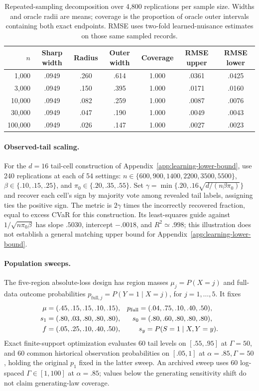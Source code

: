 \begin{table}[!htbp]
\centering\small
\setlength{\tabcolsep}{4pt}
\begin{tabular}{rcccccc}
\toprule
$n$ & Sharp width & Radius & Outer width & Coverage & RMSE upper & RMSE lower\\
\midrule
1{,}000 & .0949 & .260 & .614 & 1.000 & .0361 & .0425\\
3{,}000 & .0949 & .150 & .395 & 1.000 & .0171 & .0160\\
10{,}000 & .0949 & .082 & .259 & 1.000 & .0087 & .0076\\
30{,}000 & .0949 & .047 & .190 & 1.000 & .0049 & .0043\\
100{,}000 & .0949 & .026 & .147 & 1.000 & .0027 & .0023\\
\bottomrule
\end{tabular}
\caption{Repeated-sampling decomposition over 4,800 replications per sample size.
Widths and oracle radii are means; coverage is the proportion of oracle outer
intervals containing both exact endpoints. RMSE uses two-fold learned-nuisance estimates
on those same sampled records.}
\label{tab:finite-sample}
\end{table}

\paragraph{Observed-tail scaling.}
For the $d=16$ tail-cell construction of Appendix~\ref{app:learning-lower-bound}, use 240 replications at each of 54 settings:
$n\in\{600,900,1400,2200,3500,5500\}$,
$\beta\in\{.10,.15,.25\}$, and $\pi_0\in\{.20,.35,.55\}$.
Set $\gamma=\min\{.20,.16\sqrt{d/(n\beta\pi_0)}\}$ and recover each cell's
sign by majority vote among revealed tail labels, assigning ties the positive sign.
The metric is $2\gamma$ times the incorrectly recovered fraction, equal to excess
CVaR for this construction. Its least-squares guide against
$1/\sqrt{n\pi_0\beta}$ has slope $.5030$, intercept $-.0018$, and
$R^2\simeq.998$; this illustration does not establish a general matching upper
bound for Appendix~\ref{app:learning-lower-bound}.

\paragraph{Population sweeps.}
The five-region absolute-loss design has region masses $\mu_j=P(X=j)$ and full-data outcome probabilities $p_{\mathrm{full},j}=P(Y=1\mid X=j)$, for $j=1,\ldots,5$. It fixes
\[
\begin{aligned}
\mu&=(.45,.15,.15,.10,.15),&p_{\rm full}&=(.04,.75,.10,.40,.50),\\
s_1&=(.80,.03,.80,.80,.80),&s_0&=(.80,.60,.80,.80,.80),\\
f&=(.05,.25,.10,.40,.50),&&s_y=P(S=1\mid X,Y=y).
\end{aligned}
\]
Exact finite-support optimization evaluates 60 tail levels on $[.55,.95]$ at
$\Gamma=50$, and 60 common historical observation probabilities on $[.05,1]$ at
$\alpha=.85,\Gamma=50$, holding the original $p_1$ fixed in the latter sweep.
An archived sweep uses 60 log-spaced $\Gamma\in[1,100]$ at $\alpha=.85$;
values below the generating sensitivity shift do not claim generating-law coverage.

